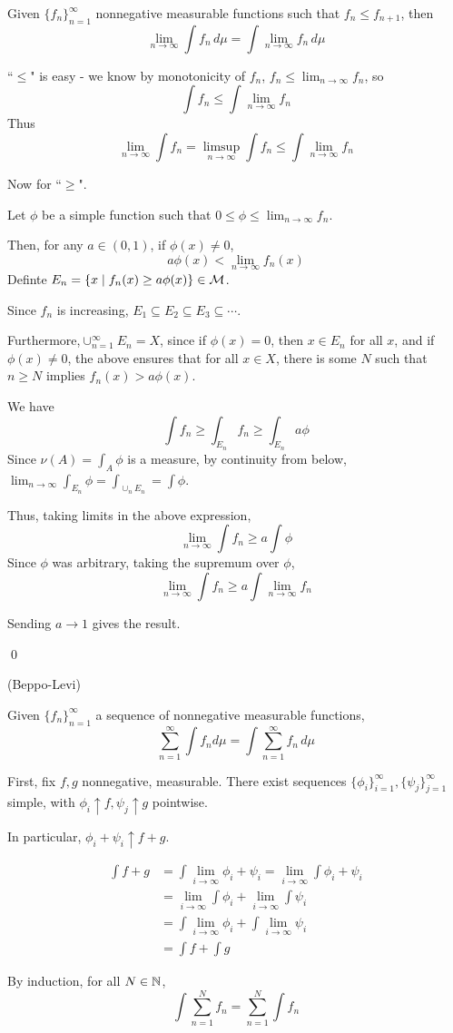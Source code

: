 \documentclass[x11names,reqno,14pt]{extarticle}
\newcommand*{\oo}{\infty}
\newcommand{\seq}[1]{_{#1 = 1}^\oo}
\begin{document}
Given $\{f_n\}\seq{n}$ nonnegative measurable functions such that $f_n\leq f_{n + 1}$, then
\[
\lim_{n\to\oo}\int f_n\,d\mu = \int\lim_{n\to\oo}f_n\,d\mu
\]

\proof

``$\leq$" is easy - we know by monotonicity of $f_n$, $f_n \leq \lim_{n\to\oo}f_n$, so
\[
\int f_n \leq \int\lim_{n\to\oo}f_n
\]
Thus
\[
\lim_{n\to\oo}\int f_n = \limsup_{n\to\oo}\int f_n \leq \int \lim_{n\to\oo}f_n
\]

Now for ``$\geq$". 

Let $\phi$ be a simple function such that $0 \leq \phi \leq \lim_{n\to\oo}f_n$. 

Then, for any $a \in (0, 1)$, if $\phi(x)\neq0$, 
\[
a\phi(x)<\lim_{n\to\oo}f_n(x)
\]
Definte $E_n = \{x \mid f_n(x) \geq a\phi(x)\} \in \mathcal{M}$.

Since $f_n$ is increasing, $E_1\subseteq E_2 \subseteq E_3 \subseteq \cdots$.

Furthermore,$\cup\seq{n}E_n = X$, since if $\phi(x) = 0$, then $x\in E_n$ for all $x$, and if $\phi(x)\neq0$, the above ensures that for all $x \in X$, there is some $N$ such that $n \geq N$ implies $f_n(x) > a\phi(x)$.  

We have 
\[
\int f_n \geq \int_{E_n}f_n \geq \int_{E_n}a\phi
\]
Since $\nu(A) = \int_A\phi$ is a measure, by continuity from below, $\lim_{n\to\oo}\int_{E_n}\phi = \int_{\cup_nE_n} = \int \phi$. 

Thus, taking limits in the above expression, 
\[
\lim_{n\to\oo}\int f_n \geq a\int \phi
\]
Since $\phi$ was arbitrary, taking the supremum over $\phi$,
\[
\lim_{n\to\oo}\int f_n \geq a \int\lim_{n\to\oo}f_n
\]

Sending $a\to 1$ gives the result. 

\qed

\thm (Beppo-Levi)

Given $\{f_n\}\seq{n}$ a sequence of nonnegative measurable functions, 
\[
\sum\seq{n}\int f_nd\mu = \int\sum\seq{n}f_n\,d\mu
\]

\proof

First, fix $f, g$ nonnegative, measurable. There exist sequences $\{\phi_i\}\seq{i}, \{\psi_j\}\seq{j}$ simple, with $\phi_i\uparrow f, \psi_j\uparrow g$ pointwise. 

In particular, $\phi_i + \psi_i \uparrow f + g$. 

\begin{align*}
\int f + g & = \int\lim_{i\to\oo}\phi_i + \psi_i = \lim_{i\to\oo}\int\phi_i + \psi_i \\
			  & = \lim_{i\to\oo}\int\phi_i + \lim_{i\to\oo}\int\psi_i \\
			  & = \int\lim_{i\to\oo}\phi_i + \int\lim_{i\to\oo}\psi_i \\
			  & = \int f + \int g 
\end{align*}

By induction, for all $N \in \mathbb{N}$,
\[
\int\sum_{n=1}^Nf_n = \sum_{n=1}^N\int f_n
\]
\end{document}
